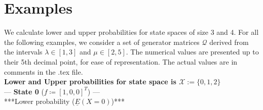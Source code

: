 \documentclass{article}
\newcommand{\statessymbol}{\mathcal{X}}
\newcommand{\stateset}{\statessymbol}
\begin{document}
\section{Examples}

We calculate lower and upper probabilities for state spaces of size 3 and 4.
For all the following examples, we consider a set of generator matrices $\mathcal{Q}$ derived from the intervals $\lambda \in[1,3]$ and $\mu \in [2,5]$.
The numerical values are presented up to their 5th decimal point, for ease of representation. 
The actual values are in comments in the .tex file.\\

\textbf{Lower and Upper probabilities for state space is $\stateset:=\{0,1,2\}$}\\

--- \textbf{State 0} ($f\coloneqq[1,0,0]^T$) ---\\

***Lower probability ($\underline{E}(X=0)$)***\\
\end{document}
